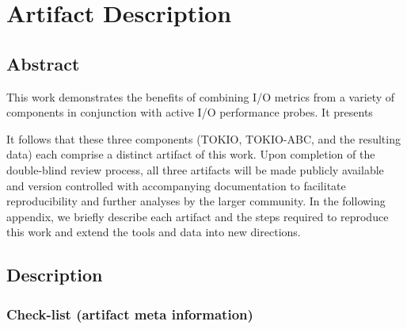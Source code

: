 \appendix

\section{Artifact Description} \label{sec:appendix/artifacts}

\subsection{Abstract}

This work demonstrates the benefits of combining I/O metrics from a variety of components in conjunction with active I/O performance probes.
It presents 

It follows that these three components (TOKIO, TOKIO-ABC, and the resulting data) each comprise a distinct artifact of this work.  Upon completion of the double-blind review process, all three artifacts will be made publicly available and version controlled with accompanying documentation to facilitate reproducibility and further analyses by the larger community.  In the following appendix, we briefly describe each artifact and the steps required to reproduce this work and extend the tools and data into new directions.

%
%


\subsection{Description}

\subsubsection{Check-list (artifact meta information)}

